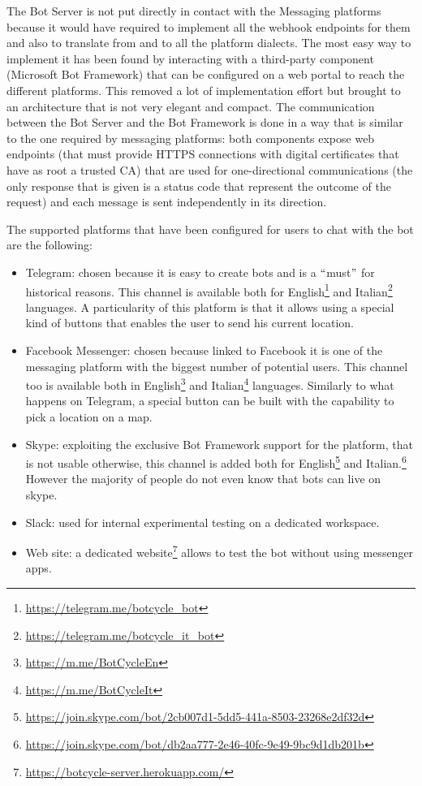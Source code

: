 The Bot Server is not put directly in contact with the Messaging platforms because it would have required to implement all the webhook endpoints for them and also to translate from and to all the platform dialects. The most easy way to implement it has been found by interacting with a third-party component (Microsoft Bot Framework) that can be configured on a web portal to reach the different platforms. This removed a lot of implementation effort but brought to an architecture that is not very elegant and compact. The communication between the Bot Server and the Bot Framework is done in a way that is similar to the one required by messaging platforms: both components expose web endpoints (that must provide HTTPS connections with digital certificates that have as root a trusted CA) that are used for one-directional communications (the only response that is given is a status code that represent the outcome of the request) and each message is sent independently in its direction.

The supported platforms that have been configured for users to chat with the bot are the following:

\begin{itemize}
	\item Telegram: chosen because it is easy to create bots and is a $``$must$"$  for historical reasons. This channel is available both for English\footnote{\url{https://telegram.me/botcycle\_bot}} and Italian\footnote{\url{https://telegram.me/botcycle\_it\_bot}} languages. A particularity of this platform is that it allows using a special kind of buttons that enables the user to send his current location.

	\item Facebook Messenger: chosen because linked to Facebook it is one of the messaging platform with the biggest number of potential users. This channel too is available both in English\footnote{\url{https://m.me/BotCycleEn}} and Italian\footnote{\url{https://m.me/BotCycleIt}} languages. Similarly to what happens on Telegram, a special button can be built with the capability to pick a location on a map.

	\item Skype: exploiting the exclusive Bot Framework support for the platform, that is not usable otherwise, this channel is added both for English\footnote{\url{https://join.skype.com/bot/2cb007d1-5dd5-441a-8503-23268e2df32d}} and Italian.\footnote{\url{https://join.skype.com/bot/db2aa777-2e46-40fc-9e49-9bc9d1db201b}} However the majority of people do not even know that bots can live on skype.

	\item Slack: used for internal experimental testing on a dedicated workspace.

	\item Web site: a dedicated website\footnote{\url{https://botcycle-server.herokuapp.com/}} allows to test the bot without using messenger apps.
\end{itemize}

